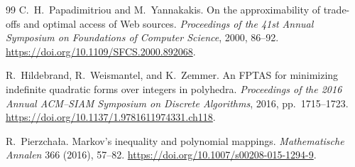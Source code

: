 \documentclass[final,5p,times,twocolumn]{elsarticle}
\theoremstyle{definition}\newtheorem{definition}{Definition}[section]
\theoremstyle{remark}\newtheorem{remark}[theorem]{Remark}
\begin{document}
\begin{thebibliography}{99}
 C.~H.~Papadimitriou and M.~Yannakakis.
On the approximability of trade-offs and optimal access of Web sources.
\emph{Proceedings of the 41st Annual Symposium on Foundations of Computer Science}, 2000, 86--92.
\url{https://doi.org/10.1109/SFCS.2000.892068}.

 R.~Hildebrand, R.~Weismantel, and K.~Zemmer.
An FPTAS for minimizing indefinite quadratic forms over integers in polyhedra.
\emph{Proceedings of the 2016 Annual ACM--SIAM Symposium on Discrete Algorithms}, 2016, pp.~1715--1723.
\url{https://doi.org/10.1137/1.9781611974331.ch118}.

 R.~Pierzcha\l a. Markov's inequality and polynomial mappings.
\emph{Mathematische Annalen} 366 (2016), 57--82.
\url{https://doi.org/10.1007/s00208-015-1294-9}.

\end{thebibliography}
\end{document}
